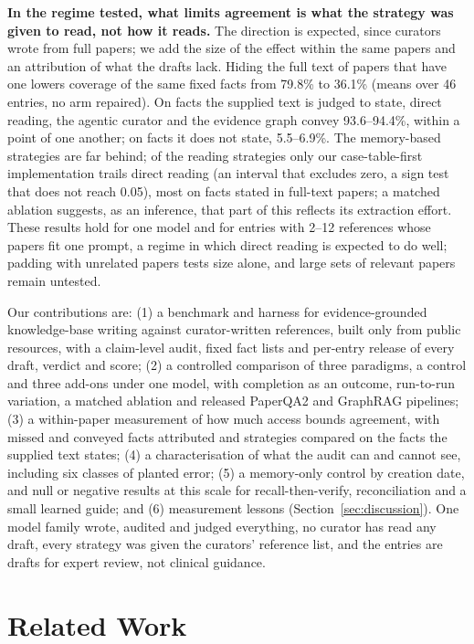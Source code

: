 \documentclass{article} %
\begin{document}
\textbf{In the regime tested, what limits agreement is what the strategy was given to read, not how it reads.} The direction is expected, since curators wrote from full papers; we add the size of the effect within the same papers and an attribution of what the drafts lack. Hiding the full text of papers that have one lowers coverage of the same fixed facts from 79.8\% to 36.1\% (means over 46 entries, no arm repaired). On facts the supplied text is judged to state, direct reading, the agentic curator and the evidence graph convey 93.6--94.4\%, within a point of one another; on facts it does not state, 5.5--6.9\%. The memory-based strategies are far behind; of the reading strategies only our case-table-first implementation trails direct reading (an interval that excludes zero, a sign test that does not reach 0.05), most on facts stated in full-text papers; a matched ablation suggests, as an inference, that part of this reflects its extraction effort. These results hold for one model and for entries with 2--12 references whose papers fit one prompt, a regime in which direct reading is expected to do well; padding with unrelated papers tests size alone, and large sets of relevant papers remain untested.

Our contributions are: (1) a benchmark and harness for evidence-grounded knowledge-base writing against curator-written references, built only from public resources, with a claim-level audit, fixed fact lists and per-entry release of every draft, verdict and score; (2) a controlled comparison of three paradigms, a control and three add-ons under one model, with completion as an outcome, run-to-run variation, a matched ablation and released PaperQA2 and GraphRAG pipelines; (3) a within-paper measurement of how much access bounds agreement, with missed and conveyed facts attributed and strategies compared on the facts the supplied text states; (4) a characterisation of what the audit can and cannot see, including six classes of planted error; (5) a memory-only control by creation date, and null or negative results at this scale for recall-then-verify, reconciliation and a small learned guide; and (6) measurement lessons (Section~\ref{sec:discussion}). One model family wrote, audited and judged everything, no curator has read any draft, every strategy was given the curators' reference list, and the entries are drafts for expert review, not clinical guidance.

\section{Related Work}
\label{sec:related_work}
\end{document}
